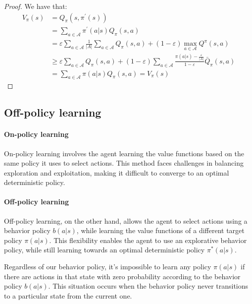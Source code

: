 \begin{proof}
    We have that: 
    \begin{align*}
        V_{\pi}(s)  &= Q_{\pi}(s, \pi^\prime(s)) \\
                    &= \sum_{a \in \mathcal{A}} \pi^\prime(a|s)Q_{\pi}(s, a) \\
                    &= \varepsilon \sum_{a \in \mathcal{A}} \frac{1}{|A|} \sum_{a \in \mathcal{A}} Q_{\pi}(s, a) + (1 - \varepsilon) \max_{a \in \mathcal{A}} Q^{\pi}(s, a) \\
                    &\geq \varepsilon \sum_{a \in \mathcal{A}} Q_{\pi}(s, a) + (1 - \varepsilon) \sum_{a \in \mathcal{A}} \frac{\pi(a|s) - \frac{\varepsilon}{|A|}}{1 - \varepsilon} \bar{Q}_{\pi}(s, a) \\
                    &= \sum_{a \in \mathcal{A}} \pi(a|s)Q_{\pi}(s, a) = V_{\pi}(s)
    \end{align*}
\end{proof}

\subsection{Off-policy learning}
\paragraph*{On-policy learning}
On-policy learning involves the agent learning the value functions based on the same policy it uses to select actions. 
This method faces challenges in balancing exploration and exploitation, making it difficult to converge to an optimal deterministic policy.

\paragraph*{Off-policy learning}
Off-policy learning, on the other hand, allows the agent to select actions using a behavior policy $b(a|s)$, while learning the value functions of a different target policy $\pi(a|s)$. 
This flexibility enables the agent to use an explorative behavior policy, while still learning towards an optimal deterministic policy $\pi^\ast(a|s)$.

Regardless of our behavior policy, it's impossible to learn any policy $\pi(a|s)$ if there are actions in that state with zero probability according to the behavior policy $b(a|s)$. 
This situation occurs when the behavior policy never transitions to a particular state from the current one.

